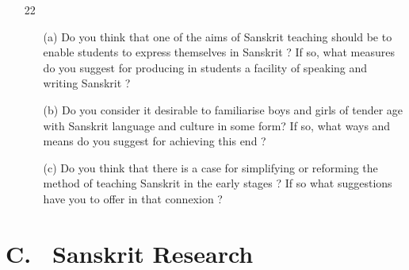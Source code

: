 {\rm 
\begin{itemize}

\item[22]  \begin{itemize}                 
             \item[(a)] Do you think that one of the aims of Sanskrit teaching should be to enable students to express themselves in Sanskrit ? If so, what measures do you suggest for producing in students a facility of speaking and writing Sanskrit ?
             
             \item[(b)] Do you consider it desirable to familiarise boys and girls of tender age with Sanskrit language and culture in some form? If so, what ways and means do you suggest for achieving this end ?
             
             \item[(c)] Do you think that there is a case for simplifying or reforming the method of teaching Sanskrit in the early stages ? If so what suggestions have you to offer in that connexion ?
             
             \end{itemize}
              
\end{itemize}
}
\section*{{\rm C.~ Sanskrit Research}}

